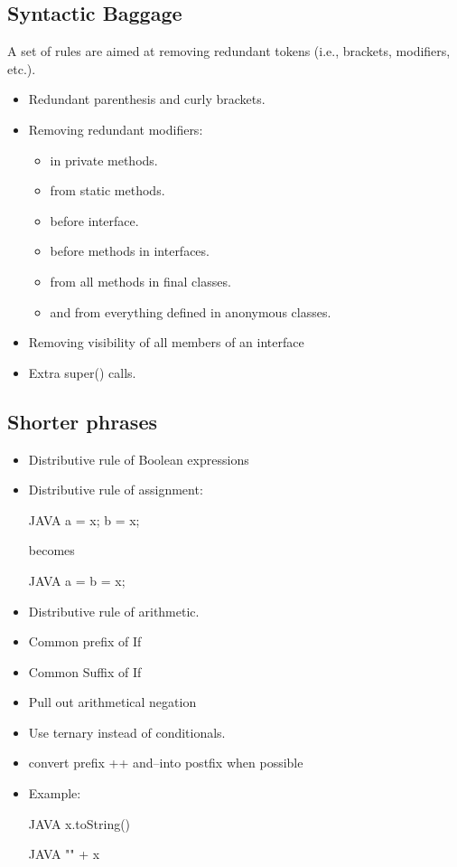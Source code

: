 \subsection{Syntactic Baggage}
A set of rules are aimed at removing redundant tokens (i.e., brackets,
modifiers, etc.).
\begin{itemize}
  \item Redundant parenthesis and curly brackets.
  \item Removing redundant modifiers:
        \begin{itemize}
          \item {} in private methods.
          \item {} from static methods.
          \item {} before interface.
          \item {} before methods in interfaces.
          \item {} from all methods in final classes.
          \item {} and  from everything defined in
                anonymous classes.
        \end{itemize}
  \item Removing visibility of all members of an interface
  \item Extra super() calls.
\end{itemize}

\subsection{Shorter phrases}
\begin{itemize}
  \item Distributive rule of Boolean expressions
  \item Distributive rule of assignment:
        \begin{code}{JAVA}
a = x;
b = x;
  \end{code}
  becomes
  \begin{code}{JAVA}
a = b = x;
  \end{code}
  \item Distributive rule of arithmetic.
  \item Common prefix of If
  \item Common Suffix of If
  \item Pull out arithmetical negation
  \item Use ternary instead of conditionals.
  \item convert prefix ++ and--into postfix when possible
  \item Example:
        \begin{code}{JAVA}
x.toString()
  \end{code}
  \begin{code}{JAVA}
"" + x
  \end{code}
\end{itemize}

